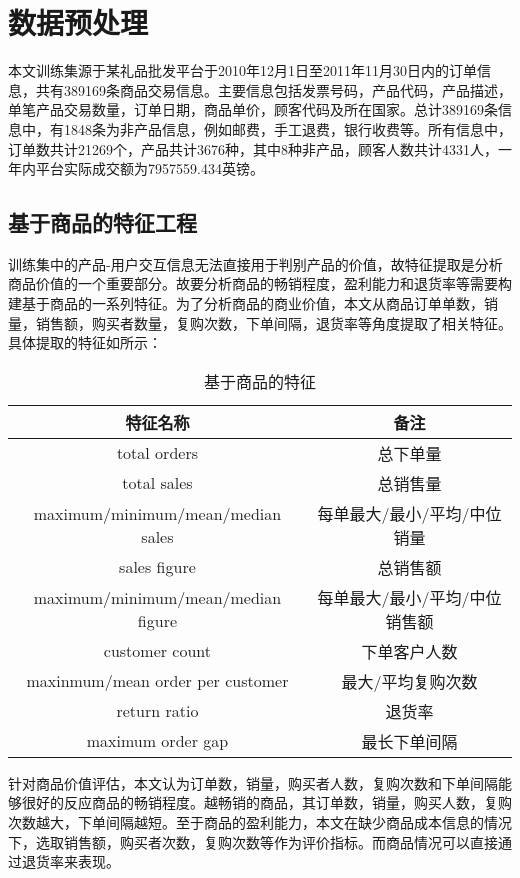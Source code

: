 \documentclass[lang=cn,11pt,a4paper,cite=authoryear]{elegantpaper}
\begin{document}
\section{数据预处理}

本文训练集源于某礼品批发平台于2010年12月1日至2011年11月30日内的订单信息，共有389169条商品交易信息。主要信息包括发票号码，产品代码，产品描述，单笔产品交易数量，订单日期，商品单价，顾客代码及所在国家。总计389169条信息中，有1848条为非产品信息，例如邮费，手工退费，银行收费等。所有信息中，订单数共计21269个，产品共计3676种，其中8种非产品，顾客人数共计4331人，一年内平台实际成交额为7957559.434英镑。

\subsection{基于商品的特征工程}

训练集中的产品-用户交互信息无法直接用于判别产品的价值，故特征提取是分析商品价值的一个重要部分。故要分析商品的畅销程度，盈利能力和退货率等需要构建基于商品的一系列特征。为了分析商品的商业价值，本文从商品订单单数，销量，销售额，购买者数量，复购次数，下单间隔，退货率等角度提取了相关特征。具体提取的特征如所示：

\begin{table}[!htb]
  \centering
  \caption{基于商品的特征}
    \huge
    \begin{tabular}{c|c}
    \hline
    \textbf{特征名称} & \textbf{备注} \\
    \hline
    total orders  & 总下单量 \\
    total sales    & 总销售量 \\
    maximum/minimum/mean/median sales & 每单最大/最小/平均/中位销量  \\
    sales figure   & 总销售额 \\
    maximum/minimum/mean/median figure & 每单最大/最小/平均/中位销售额 \\
    customer count & 下单客户人数 \\
    maxinmum/mean order per customer & 最大/平均复购次数 \\
    return ratio & 退货率 \\
    maximum order gap & 最长下单间隔 \\
    \hline
    \end{tabular}
  \label{基于商品的特征}
\end{table}

针对商品价值评估，本文认为订单数，销量，购买者人数，复购次数和下单间隔能够很好的反应商品的畅销程度。越畅销的商品，其订单数，销量，购买人数，复购次数越大，下单间隔越短。至于商品的盈利能力，本文在缺少商品成本信息的情况下，选取销售额，购买者次数，复购次数等作为评价指标。而商品情况可以直接通过退货率来表现。
\end{document}
